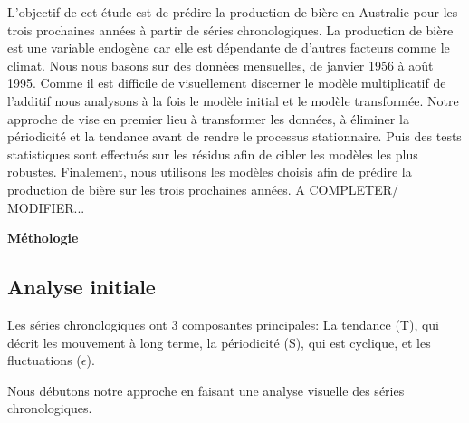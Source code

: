 \documentclass[12pt,a4paper]{book}
\newcommand{\1}{\mathds{1}}
\begin{document}
L'objectif de cet étude est de prédire la production de bière en Australie pour les trois prochaines années à partir de séries chronologiques. La production de bière est une variable endogène car elle est dépendante de d'autres facteurs comme le climat. Nous nous basons sur des données mensuelles, de janvier 1956 à août 1995. Comme il est difficile de visuellement discerner le modèle multiplicatif de l'additif nous analysons à la fois le modèle initial et le modèle transformée. Notre approche de vise en premier lieu à transformer les données, à éliminer la périodicité et la tendance avant de rendre le processus stationnaire. Puis des tests statistiques sont effectués sur les résidus afin de cibler les modèles les plus robustes. Finalement, nous utilisons les modèles choisis afin de prédire la production de bière sur les trois prochaines années. 
A COMPLETER/ MODIFIER...


\vspace{15 mm}


\noindent
{\LARGE \textbf{Méthologie}}
\vspace{5 mm}


\subsection{Analyse initiale}

Les séries chronologiques ont 3 composantes principales: La tendance (T), qui décrit les mouvement à long terme, la périodicité (S), qui est cyclique, et les fluctuations ($\epsilon$).

\vspace{5 mm}
Nous débutons notre approche en faisant une analyse visuelle des séries chronologiques.
\end{document}
